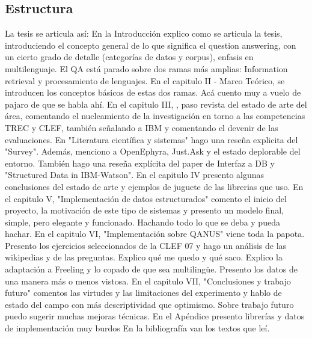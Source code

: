 \subsection*{Estructura}

La tesis se articula así: En la Introducción explico como se articula la tesis, introduciendo el concepto general de lo que significa el question answering, con un cierto grado de detalle (categorías de datos y corpus), enfasis en multilenguaje. 
El QA está parado sobre dos ramas más amplias: Information retrieval y procesamiento de lenguajes. En el capitulo II - Marco Teórico, se introducen los conceptos básicos de estas dos ramas. Acá cuento muy a vuelo de pajaro de que se habla ahí.
En el capitulo III, , paso revista del estado de arte del área, comentando el nucleamiento de la investigación en torno a las competencias TREC y CLEF, también señalando a IBM y comentando el devenir de las evaluaciones. En "Literatura científica y sistemas" hago una reseña explicita del "Survey". Además, menciono a OpenEphyra, Just.Ask y el estado deplorable del entorno. También hago una reseña explícita del paper de Interfaz a DB y "Structured Data in IBM-Watson". 
En el capitulo IV presento algunas conclusiones del estado de arte y ejemplos de juguete de las librerias que uso.
En el capitulo V, "Implementación de datos estructurados" comento el inicio del proyecto, la motivación de este tipo de sistemas y presento un modelo final, simple, pero elegante y funcionado. Hachando todo lo que se deba y pueda hachar. 
En el capitulo VI, "Implementación sobre QANUS" viene toda la papota. Presento los ejercicios seleccionados de la CLEF 07 y hago un análisis de las wikipedias y de las preguntas. Explico qué me quedo y qué saco. Explico la adaptación a Freeling y lo copado de que sea multilingüe. Presento los datos de una manera más o menos vistosa.
En el capitulo VII, "Conclusiones y trabajo futuro" comentos las virtudes y las limitaciones del experimento y hablo de estado del campo con más descriptividad que optimismo. Sobre trabajo futuro puedo sugerir muchas mejoras técnicas. 
En el Apéndice presento librerías y datos de implementación muy burdos
En la bibliografía van los textos que leí.


